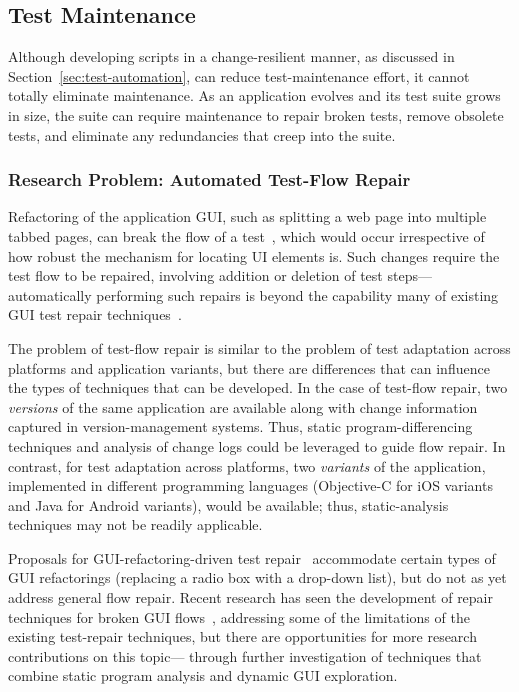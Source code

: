 \subsection{Test Maintenance}
\label{sec:test-maintenance}

Although developing scripts in a change-resilient manner, as discussed in
Section~\ref{sec:test-automation}, can reduce test-maintenance effort, it cannot
totally eliminate maintenance. As an application evolves and its test suite
grows in size, the suite can require maintenance to repair broken tests, remove
obsolete tests, and eliminate any redundancies that creep into the suite.

\subsubsection*{Research Problem: Automated Test-Flow Repair}

Refactoring of the application GUI, such as splitting a web page into multiple
tabbed pages, can break the flow of a test~\cite{thummalapenta:2013a}, which
would occur irrespective of how robust the mechanism for locating UI elements
is. Such changes require the test flow to be repaired, involving addition or
deletion of test steps---automatically performing such repairs is beyond the
capability many of existing GUI test repair techniques~\cite{Choudhary:2011,
  Grechanik:2009, Memon:2008}.

The problem of test-flow repair is similar to the problem of test adaptation
across platforms and application variants, but there are differences that can
influence the types of techniques that can be developed. In the case of
test-flow repair, two \textit{versions} of the same application are available
along with change information captured in version-management systems. Thus,
static program-differencing techniques and analysis of change logs could be
leveraged to guide flow repair. In contrast, for test adaptation across
platforms, two \textit{variants} of the application, implemented in different
programming languages (\eg Objective-C for iOS variants and Java for Android
variants), would be available; thus, static-analysis techniques may not be
readily applicable.

Proposals for GUI-refactoring-driven test repair~\cite{Daniel2011} accommodate
certain types of GUI refactorings (\eg replacing a radio box with a drop-down
list), but do not as yet address general flow repair.  Recent research has seen
the development of repair techniques for broken GUI flows~\cite{Zhang2013},
addressing some of the limitations of the existing test-repair techniques, but
there are opportunities for more research contributions on this topic---\eg
through further investigation of techniques that combine static program analysis
and dynamic GUI exploration.

